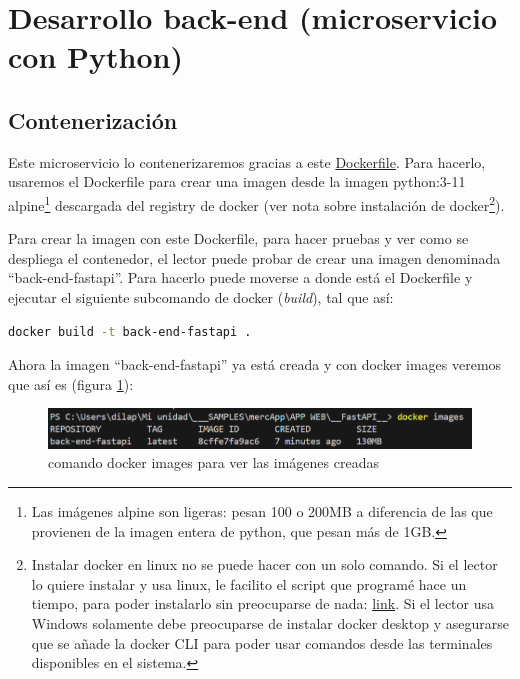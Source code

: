 \documentclass[a4paper,12pt]{report}
\begin{document}
			
			
			
			

			
	\section{Desarrollo back-end (microservicio con Python)}
	
	\subsection{Contenerización}
	
	Este microservicio lo contenerizaremos gracias a este \href{https://github.com/blackcub3s/mercApp/tree/main/APP%20WEB/__FastAPI__/Dockerfile}{Dockerfile}. Para hacerlo, usaremos el Dockerfile para crear una imagen desde la imagen python:3-11 alpine\footnote{Las imágenes alpine son ligeras: pesan 100 o 200MB a diferencia de las que provienen de la imagen entera de python, que pesan más de 1GB.} descargada del registry de docker (ver nota sobre instalación de docker\footnote{ Instalar docker en linux no se puede hacer con un solo comando. Si el lector lo quiere instalar y usa linux, le facilito el script que programé hace un tiempo, para poder instalarlo sin preocuparse de nada: \href{https://github.com/blackcub3s/mercApp/blob/main/auxiliars/instalaDocker.sh}{link}. Si el lector usa Windows solamente debe preocuparse de instalar docker desktop y asegurarse que se añade la docker CLI para poder usar comandos desde las terminales disponibles en el sistema.}). 
	
	Para crear la imagen con este Dockerfile, para hacer pruebas y ver como se despliega el contenedor, el lector puede probar de crear una imagen denominada ``back-end-fastapi''. Para hacerlo puede moverse a donde está el Dockerfile y ejecutar el siguiente subcomando de docker (\textit{build}), tal que así:
	
	\begin{lstlisting}[language=bash]
		docker build -t back-end-fastapi .
	\end{lstlisting}
	
		Ahora la imagen ``back-end-fastapi'' ya está creada y con docker images veremos que así es (figura \ref{fig:dockerimages}):
	\FloatBarrier
	\begin{figure}[H]
		\centering
		\caption{comando docker images para ver las imágenes creadas}
		\label{fig:dockerimages}
		\includegraphics[width=1\linewidth]{img/dockerImages}
	\end{figure}
	\FloatBarrier
	
\end{document}
